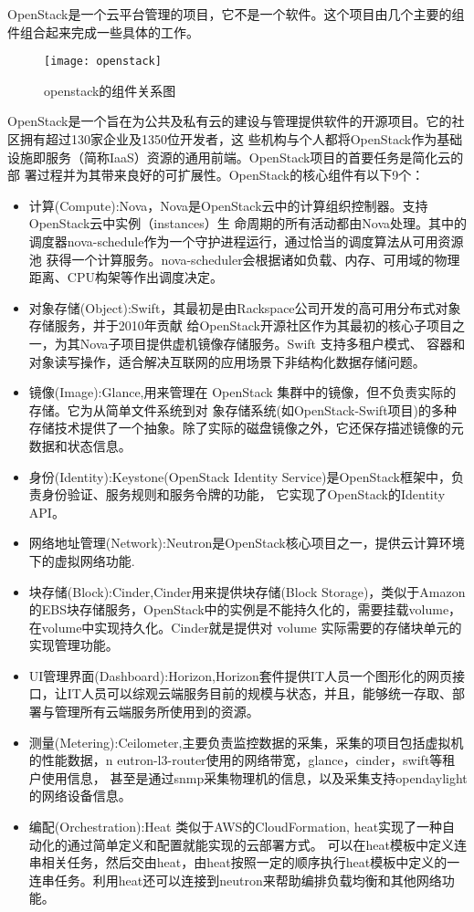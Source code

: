 OpenStack是一个云平台管理的项目，它不是一个软件。这个项目由几个主要的组件组合起来完成一些具体的工作。
\begin{figure}[htbp]
\centering\texttt{[image: openstack]}
\caption{openstack的组件关系图}\label{fig:openstack}
\end{figure}
OpenStack是一个旨在为公共及私有云的建设与管理提供软件的开源项目。它的社区拥有超过130家企业及1350位开发者，这
些机构与个人都将OpenStack作为基础设施即服务（简称IaaS）资源的通用前端。OpenStack项目的首要任务是简化云的部
署过程并为其带来良好的可扩展性。OpenStack的核心组件有以下9个：
\begin{itemize}
\item 计算(Compute):Nova，Nova是OpenStack云中的计算组织控制器。支持OpenStack云中实例（instances）生
命周期的所有活动都由Nova处理。其中的调度器nova-schedule作为一个守护进程运行，通过恰当的调度算法从可用资源池
获得一个计算服务。nova-scheduler会根据诸如负载、内存、可用域的物理距离、CPU构架等作出调度决定。
\item 对象存储(Object):Swift，其最初是由Rackspace公司开发的高可用分布式对象存储服务，并于2010年贡献
给OpenStack开源社区作为其最初的核心子项目之一，为其Nova子项目提供虚机镜像存储服务。Swift 支持多租户模式、
容器和对象读写操作，适合解决互联网的应用场景下非结构化数据存储问题。
\item 镜像(Image):Glance,用来管理在 OpenStack 集群中的镜像，但不负责实际的存储。它为从简单文件系统到对
象存储系统(如OpenStack-Swift项目)的多种存储技术提供了一个抽象。除了实际的磁盘镜像之外，它还保存描述镜像的元数据和状态信息。
\item 身份(Identity):Keystone(OpenStack Identity Service)是OpenStack框架中，负责身份验证、服务规则和服务令牌的功能， 它实现了OpenStack的Identity API。
\item 网络地址管理(Network):Neutron是OpenStack核心项目之一，提供云计算环境下的虚拟网络功能.
\item 块存储(Block):Cinder,Cinder用来提供块存储(Block Storage)，类似于Amazon的EBS块存储服务，OpenStack中的实例是不能持久化的，需要挂载volume，在volume中实现持久化。Cinder就是提供对 volume 实际需要的存储块单元的实现管理功能。
\item UI管理界面(Dashboard):Horizon,Horizon套件提供IT人员一个图形化的网页接口，让IT人员可以综观云端服务目前的规模与状态，并且，能够统一存取、部署与管理所有云端服务所使用到的资源。
\item 测量(Metering):Ceilometer,主要负责监控数据的采集，采集的项目包括虚拟机的性能数据，n
eutron-l3-router使用的网络带宽，glance，cinder，swift等租户使用信息，
甚至是通过snmp采集物理机的信息，以及采集支持opendaylight的网络设备信息。
\item 编配(Orchestration):Heat 类似于AWS的CloudFormation, heat实现了一种自动化的通过简单定义和配置就能实现的云部署方式。
可以在heat模板中定义连串相关任务，然后交由heat，由heat按照一定的顺序执行heat模板中定义的一连串任务。利用heat还可以连接到neutron来帮助编排负载均衡和其他网络功能。
\end{itemize}

